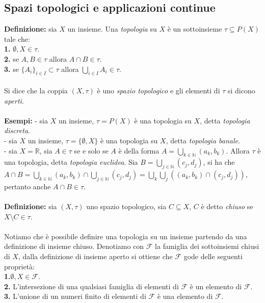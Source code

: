 \documentclass{article}
\begin{document}
\subsection{Spazi topologici e applicazioni continue}
\textbf{Definizione:} sia $X$ un insieme. Una \textit{topologia} su $X$ è un sottoinsieme $\tau \subseteq P(X)$ tale che: \\
\textbf{1.} $\emptyset, X \in \tau$. \\
\textbf{2.} se $A, B \in \tau$ allora $A \cap B \in \tau$. \\
\textbf{3.} se $\{ A_i \}_{i \in I} \subset \tau$ allora $\bigcup_{i \in I} A_i \in \tau$. \\ \\
Si dice che la coppia $(X, \tau)$ è uno \textit{spazio topologico} e gli elementi di $\tau$ si dicono \textit{aperti}. \\ \\
\textbf{Esempi:} - sia $X$ un insieme, $\tau = P(X)$ è una topologia su $X$, detta \textit{topologia discreta}. \\
- sia $X$ un insieme, $\tau = \{ \emptyset, X \}$ è una topologia su $X$, detta \textit{topologia banale}. \\
- sia $X = \mathbb{R}$, sia $A \in \tau$ se e solo se $A$ è della forma $A = \bigcup_{k \in \mathbb{N}} (a_k, b_k)$. Allora $\tau$ è una topologia, detta \textit{topologia euclidea}. Sia $B = \bigcup_{j \in \mathbb{N}} (c_j, d_j)$, si ha che $A \cap B = \bigcup_{k \in \mathbb{N}} (a_k, b_k) \cap \bigcup_{j \in \mathbb{N}} (c_j, d_j) = \bigcup_k \bigcup_j ((a_k, b_k) \cap (c_j, d_j))$, pertanto anche $A \cap B \in \tau$. \\ \\
\textbf{Definizione:} sia $(X, \tau)$ uno spazio topologico, sia $C \subseteq X$, $C$ è detto \textit{chiuso} se $X \setminus C \in \tau$. \\ \\
Notiamo che è possibile definire una topologia su un insieme partendo da una definizione di insieme chiuso. Denotiamo con $\mathcal{F}$ la famiglia dei sottoinsiemi chiusi di $X$, dalla definizione di insieme aperto si ottiene che $\mathcal{F}$ gode delle seguenti proprietà: \\
\textbf{1.}$\emptyset, X \in \mathcal{F}$. \\
\textbf{2.} L'intersezione di una qualsiasi famiglia di elementi di $\mathcal{F}$ è un elemento di $\mathcal{F}$. \\
\textbf{3.} L'unione di un numeri finito di elementi di $\mathcal{F}$ è una elemento di $\mathcal{F}$. \\ \\
\end{document}
